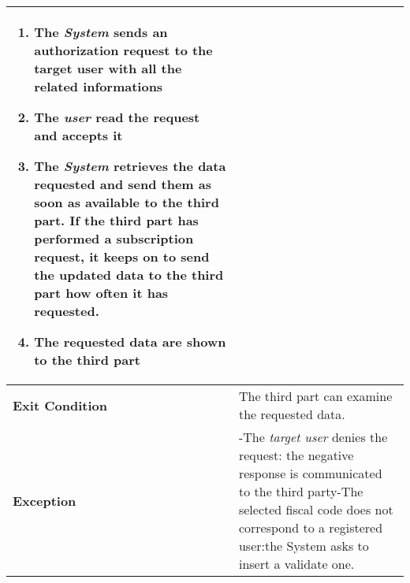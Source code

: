 \begin{table}[H]
\begin{tabular}{|p{3.5cm}|p{10.3cm}|}
\begin{enumerate}[leftmargin=0.5cm]
                            \item The \emph{System} sends an authorization request to the target user with all the related informations
                                            
                                            \item  The  \emph{user} read the request and accepts it
                                            \item The \emph{System} retrieves the data requested and send them as soon as available to the third part. If the third part has performed a subscription request, it keeps on to send the updated data to the third part how often it has requested.
                                            \item The requested data are shown to the third part
                                
                                          \end{enumerate}
    										\\
    \hline
    \textbf{\large{Exit Condition}} 	& The third part can examine the requested data. \\
    
    \hline
    \textbf{\large{Exception}} 			& -The \emph{target user} denies the request: the negative response is communicated to the third party\newline -The selected fiscal code does not correspond to a registered user:the System asks to insert a validate one.\\
    
    \hline
    
    
    \end{tabular}
	
\end{table}
